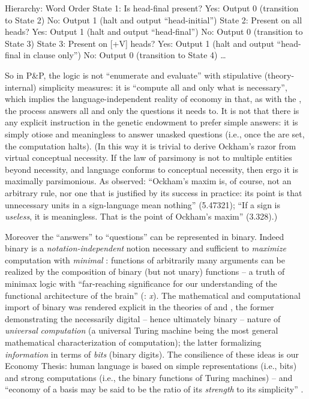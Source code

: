 \documentclass[output=paper]{langsci/langscibook}
\begin{document}
\ea Hierarchy: Word Order
    \sn State 1: Is head-final present?
    \sn Yes: Output 0 (transition to State 2)
    \sn No: Output 1 (halt and output “head-initial”)
    \sn {}
    \sn State 2: Present on all heads?
    \sn Yes: Output 1 (halt and output “head-final”)
    \sn No: Output 0 (transition to State 3)
    \sn {}
    \sn State 3: Present on [+V] heads?
    \sn Yes: Output 1 (halt and output “head-final in clause only”)
    \sn No: Output 0 (transition to State 4)
    \sn \dots{}
\z

So in P\&P, the logic is not “enumerate and evaluate” with stipulative
(theory-internal) simplicity measures: it is “compute all and only what is
necessary”, which implies the language-independent reality of economy in that,
as with the , the process answers all and only the
questions it needs to. It is not that there is any explicit instruction in the
genetic endowment to prefer simple answers: it is simply otiose and meaningless
to answer unasked questions (i.e., once the  are set, the computation
halts). (In this way it is trivial to derive Ockham’s razor from virtual
conceptual necessity. If the law of parsimony is not to multiple entities
beyond necessity, and language conforms to conceptual necessity, then ergo it
is maximally parsimonious. As \citet{Wittgenstein1922} observed: “Ockham’s
maxim is, of course, not an arbitrary rule, nor one that is justified by its
success in practice: its point is that unnecessary units in a sign-language
mean nothing” (5.47321); “If a sign is \emph{useless}, it is meaningless. That
is the point of Ockham’s maxim” (3.328).)

Moreover the “answers” to “questions” can be represented in binary. Indeed
binary is a \emph{notation-independent} notion necessary and sufficient to
\emph{maximize} computation with \emph{minimal} : functions of
arbitrarily many arguments can be realized by the composition of binary (but
not unary) functions – a truth of minimax logic with “far-reaching significance
for our understanding of the functional architecture of the brain”
(\citealt{GallistelKing2010}: \emph{x}). The mathematical and computational
import of binary was rendered explicit in the theories of \citet{Turing1936}
and \citet{Shannon1948}, the former demonstrating the necessarily digital –
hence ultimately binary – nature of \emph{universal} \emph{computation} (a
universal Turing machine being the most general mathematical characterization
of computation); the latter formalizing \emph{information} in terms of
\emph{bits} (binary digits). The consilience of these ideas is our Economy
Thesis: human language is based on simple representations (i.e., bits) and
strong computations (i.e., the binary functions of Turing machines) – and
“economy of a basis may be said to be the ratio of its \emph{strength} to its
simplicity” \citep[111]{Goodman1943}.
\end{document}
